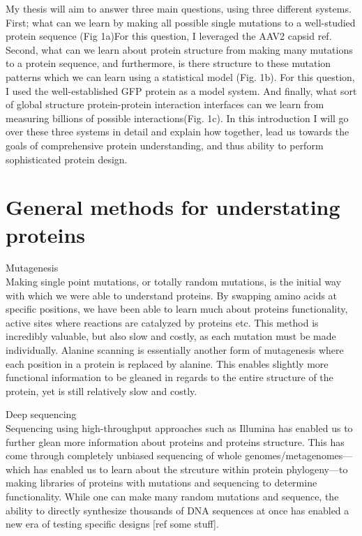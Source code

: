 My thesis will aim to answer three main questions, using three different systems. First; what can we learn by making all possible single mutations to a well-studied protein sequence (Fig 1a)For this question, I leveraged the AAV2 capsid {ref}. Second, what can we learn about protein structure from making many mutations to a protein sequence, and furthermore, is there structure to these mutation patterns which we can learn using a statistical model (Fig. 1b). For this question, I used the well-established GFP protein as a model system. And finally, what sort of global structure protein-protein interaction interfaces can we learn from measuring billions of possible interactions(Fig. 1c). In this introduction I will go over these three systems in detail and explain how together, lead us towards the goals of comprehensive protein understanding, and thus ability to perform sophisticated protein design. 

\section{General methods for understating proteins}

Mutagenesis\\
Making single point mutations, or totally random mutations, is the initial way with which we were able to understand proteins. By swapping amino acids at specific positions, we have been able to learn much about proteins functionality, active sites where reactions are catalyzed by proteins etc. This method is incredibly valuable, but also slow and costly, as each mutation must be made individually. 
Alanine scanning is essentially another form of mutagenesis where each position in a protein is replaced by alanine. This enables slightly more functional information to be gleaned in regards to the entire structure of the protein, yet is still relatively slow and costly.

Deep sequencing\\
Sequencing using high-throughput approaches such as Illumina has enabled us to further glean more information about proteins and proteins structure. This has come through completely unbiased sequencing of whole genomes/metagenomes---which has enabled us to learn about the strcuture within protein phylogeny---to making libraries of proteins with mutations and sequencing to determine functionality. While one can make many random mutations and sequence, the ability to directly synthesize thousands of DNA sequences at once has enabled a new era of testing specific designs [ref some stuff]. 

